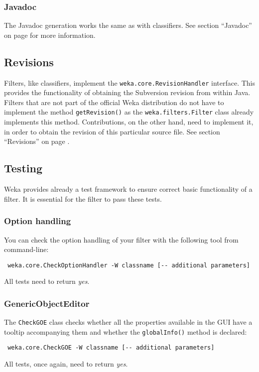 \subsubsection*{Javadoc}
The Javadoc generation works the same as with classifiers. See section
``Javadoc'' on page \pageref{classifier_javadoc} for more information.

\subsection{Revisions}
\label{filter_revisions}
Filters, like classifiers, implement the \texttt{weka.core.RevisionHandler}
interface. This provides the functionality of obtaining the Subversion revision
from within Java. Filters that are not part of the official Weka distribution
do not have to implement the method \texttt{getRevision()} as the
\texttt{weka.filters.Filter} class already implements this method.
Contributions, on the other hand, need to implement it, in order to
obtain the revision of this particular source file. See section ``Revisions''
on page \pageref{classifier_revisions}.

\newpage
\subsection{Testing}
Weka provides already a test framework to ensure correct basic functionality of
a filter. It is essential for the filter to pass these tests.

\subsubsection{Option handling}
You can check the option handling of your filter with the following tool from
command-line:
\begin{verbatim}
 weka.core.CheckOptionHandler -W classname [-- additional parameters]
\end{verbatim}
All tests need to return \textit{yes}.

\subsubsection{GenericObjectEditor}
The \texttt{CheckGOE} class checks whether all the properties available in the
GUI have a tooltip accompanying them and whether the \texttt{globalInfo()}
method is declared:
\begin{verbatim}
 weka.core.CheckGOE -W classname [-- additional parameters]
\end{verbatim}
All tests, once again, need to return \textit{yes}.

